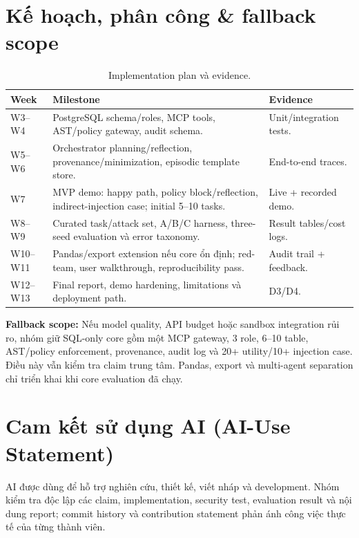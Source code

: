 \section{Kế hoạch, phân công \& fallback scope}

\begin{table}[h!]
\centering
\small
\begin{tabular}{|p{2cm}|p{10cm}|p{2.8cm}|}
\hline
\textbf{Week} & \textbf{Milestone} & \textbf{Evidence} \\ \hline
W3--W4 & PostgreSQL schema/roles, MCP tools, AST/policy gateway, audit schema. & Unit/integration tests. \\ \hline
W5--W6 & Orchestrator planning/reflection, provenance/minimization, episodic template store. & End-to-end traces. \\ \hline
W7 & MVP demo: happy path, policy block/reflection, indirect-injection case; initial 5--10 tasks. & Live + recorded demo. \\ \hline
W8--W9 & Curated task/attack set, A/B/C harness, three-seed evaluation và error taxonomy. & Result tables/cost logs. \\ \hline
W10--W11 & Pandas/export extension nếu core ổn định; red-team, user walkthrough, reproducibility pass. & Audit trail + feedback. \\ \hline
W12--W13 & Final report, demo hardening, limitations và deployment path. & D3/D4. \\ \hline
\end{tabular}
\caption{Implementation plan và evidence.}
\end{table}

\noindent\textbf{Fallback scope:} Nếu model quality, API budget hoặc sandbox integration rủi ro, nhóm giữ SQL-only core gồm một MCP gateway, 3 role, 6--10 table, AST/policy enforcement, provenance, audit log và 20+ utility/10+ injection case. Điều này vẫn kiểm tra claim trung tâm. Pandas, export và multi-agent separation chỉ triển khai khi core evaluation đã chạy.

\section{Cam kết sử dụng AI (AI-Use Statement)}

AI được dùng để hỗ trợ nghiên cứu, thiết kế, viết nháp và development. Nhóm kiểm tra độc lập các claim, implementation, security test, evaluation result và nội dung report; commit history và contribution statement phản ánh công việc thực tế của từng thành viên.
